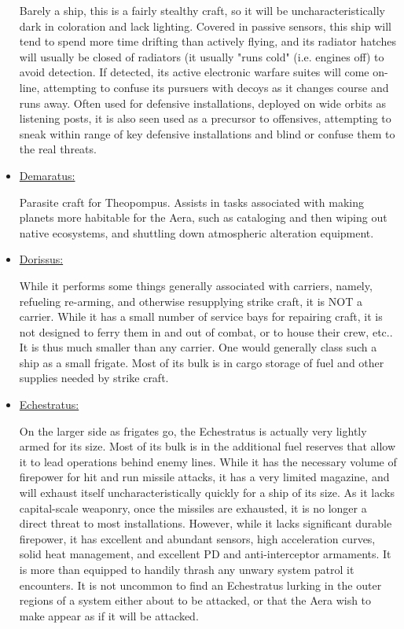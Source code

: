 \begin{itemize}
Barely a ship, this is a fairly stealthy craft, so it will be
uncharacteristically dark in coloration and lack lighting. Covered in
passive sensors, this ship will tend to spend more time drifting than
actively flying, and its radiator hatches will usually be closed of
radiators (it usually "runs cold" (i.e. engines off) to avoid
detection. If detected, its active electronic warfare suites will come
on-line, attempting to confuse its pursuers with decoys as it changes
course and runs away. Often used for defensive installations, deployed
on wide orbits as listening posts, it is also seen used as a precursor
to offensives, attempting to sneak within range of key defensive
installations and blind or confuse them to the real threats.

\item \href{http://vegastrike.sourceforge.net/wiki/Vessel:Demaratus}{Demaratus:}

Parasite craft for Theopompus. Assists in tasks associated with making
planets more habitable for the Aera, such as cataloging and then
wiping out native ecosystems, and shuttling down atmospheric
alteration equipment.


\item \href{http://vegastrike.sourceforge.net/wiki/Vessel:Dorissus}{Dorissus:}

While it performs some things generally associated with carriers,
namely, refueling re-arming, and otherwise resupplying strike craft,
it is NOT a carrier. While it has a small number of service bays for
repairing craft, it is not designed to ferry them in and out of
combat, or to house their crew, etc.. It is thus much smaller than any
carrier. One would generally class such a ship as a small
frigate. Most of its bulk is in cargo storage of fuel and other
supplies needed by strike craft.


\item \href{http://vegastrike.sourceforge.net/wiki/Vessel:Echestratus}{Echestratus:}

On the larger side as frigates go, the Echestratus is actually very
lightly armed for its size. Most of its bulk is in the additional fuel
reserves that allow it to lead operations behind enemy lines. While it
has the necessary volume of firepower for hit and run missile attacks,
it has a very limited magazine, and will exhaust itself
uncharacteristically quickly for a ship of its size. As it lacks
capital-scale weaponry, once the missiles are exhausted, it is no
longer a direct threat to most installations. However, while it lacks
significant durable firepower, it has excellent and abundant sensors,
high acceleration curves, solid heat management, and excellent PD and
anti-interceptor armaments. It is more than equipped to handily thrash
any unwary system patrol it encounters. It is not uncommon to find an
Echestratus lurking in the outer regions of a system either about to
be attacked, or that the Aera wish to make appear as if it will be
attacked.




\end{itemize}
